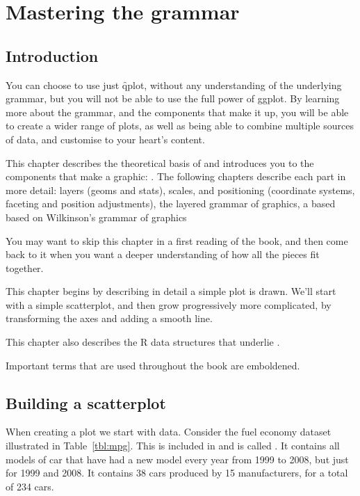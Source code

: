 

\chapter{Mastering the grammar}
\label{cha:mastery}


\section{Introduction}\label{sec:introduction}

You can choose to use just \f{qplot}, without any understanding of the underlying grammar, but you will not be able to use the full power of ggplot.  By learning more about the grammar, and the components that make it up, you will be able to create a wider range of plots, as well as being able to combine multiple sources of data, and customise to your heart's content.

This chapter describes the theoretical basis of \ggplot and introduces you to the components that make a \ggplot graphic:  .  The following chapters describe each part in more detail: layers (geoms and stats), scales, and positioning (coordinate systems, faceting and position adjustments), the layered grammar of graphics, a based based on Wilkinson's grammar of graphics \citep{wilkinson:2006}

You may want to skip this chapter in a first reading of the book, and then come back to it when you want a deeper understanding of how all the pieces fit together.

This chapter begins by describing in detail a simple plot is drawn.  We'll start with a simple scatterplot, and then grow progressively more complicated, by transforming the axes and adding a smooth line.

This chapter also describes the R data structures that underlie \ggplot.  

Important terms that are used throughout the book are emboldened.

\section{Building a scatterplot}
\label{sec:building_a_plot}

When creating a plot we start with data.  Consider the fuel economy dataset illustrated in Table~\ref{tbl:mpg}.  This is included in \ggplot and is called .  It contains all models of car that have had a new model every year from 1999 to 2008, but just for 1999 and 2008. It contains 38 cars produced by 15 manufacturers, for a total of 234 cars.


